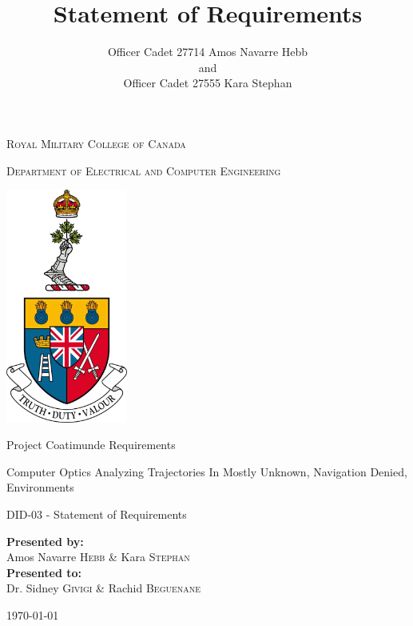 \documentclass{article}
\title{Statement of Requirements}
\author{Officer Cadet 27714 Amos Navarre Hebb\\and\\Officer Cadet 27555 Kara Stephan}
\begin{document}
	
\begin{titlepage}
	\begin{center}
		\vspace*{1cm}
		
		\LARGE\textsc{Royal Military College of Canada}\normalsize
		
		\vspace{0.2cm}
		
		\textsc{Department of Electrical and Computer Engineering}
		
		\vspace{1.5cm}
		
		\includegraphics[width=0.3\textwidth]{rmcLogo.png}
		
		\vspace{1.5cm}
		
		\LARGE{Project Coatimunde Requirements\\}
		
		\vspace{0.2cm}
		
		\normalsize{Computer Optics Analyzing Trajectories In Mostly Unknown, Navigation Denied, Environments}
		
		\vspace{0.1cm}
		
		\normalsize{DID-03 - Statement of Requirements}
		
		\vfill
		
		\textbf{Presented by:}\\Amos Navarre \textsc{Hebb} \& Kara \textsc{Stephan}\\
		\vspace{0.8cm}
		\textbf{Presented to:}\\Dr. Sidney \textsc{Givigi} \& Rachid \textsc{Beguenane}
		\vspace{0.8cm}
		
		\today
		
	\end{center}
\end{titlepage}
\end{document}
